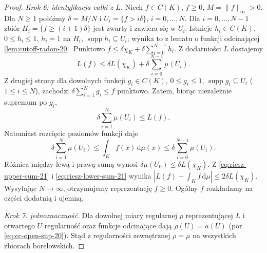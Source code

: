 \documentclass[11pt,a4paper,oneside]{book}
\numberwithin{equation}{chapter}
\theoremstyle{plain}
\theoremstyle{definition}
\theoremstyle{remark}
\begin{document}
\begin{proof}
\emph{Krok 6: identyfikacja całki z $L$.}
Niech $f\in C(K)$, $f\ge0$, $M=\|f\|_\infty>0$.
Dla $N\ge1$ połóżmy $\delta=M/N$ i
$U_i=\{f>i\delta\}$, $i=0,\ldots,N$.
Dla $i=0,\ldots,N-1$ zbiór
$H_i=\{f\ge(i+1)\delta\}$ jest zwarty i zawiera się
w $U_i$. Istnieje $h_i\in C(K)$, $0\le h_i\le1$,
$h_i=1$ na $H_i$, $\operatorname{supp}h_i\subseteq U_i$;
wynika to z lematu o funkcji odcinającej
\ref{lem:cutoff-radon-20}. Punktowo
$f\le\delta\chi_K+\delta\sum_{i=0}^{N-1}h_i$.
Z dodatniości $L$ dostajemy
\begin{equation}\label{eq:riesz-upper-sum-21}
 L(f)\le\delta L(\chi_K)+
           \delta\sum_{i=0}^{N-1}\mu(U_i).
\end{equation}
Z drugiej strony dla dowolnych funkcji
$g_i\in C(K)$, $0\le g_i\le1$,
$\operatorname{supp}g_i\subseteq U_i$ ($1\le i\le N$),
zachodzi $\delta\sum_{i=1}^{N}g_i\le f$ punktowo.
Zatem, biorąc niezależnie supremum po $g_i$,
\begin{equation}\label{eq:riesz-lower-sum-21}
 \delta\sum_{i=1}^{N}\mu(U_i)\le L(f).
\end{equation}
Natomiast rozcięcie poziomów funkcji daje
\[
 \delta\sum_{i=1}^{N}\mu(U_i)
 \le\int_Kf(x)\,\mathrm d\mu(x)
 \le\delta\sum_{i=0}^{N-1}\mu(U_i).
\]
Różnica między lewą i prawą sumą wynosi
$\delta\mu(U_0)\le\delta L(\chi_K)$.
Z \eqref{eq:riesz-upper-sum-21} i
\eqref{eq:riesz-lower-sum-21} wynika
$|L(f)-\int_K f\,\mathrm d\mu|\le2\delta L(\chi_K)$.
Wysyłając $N\to\infty$, otrzymujemy reprezentację
$f\ge0$. Ogólny $f$ rozkładamy na części dodatnią
i ujemną.

\emph{Krok 7: jednoznaczność.}
Dla dowolnej miary regularnej $\rho$ reprezentującej $L$
i otwartego $U$ regularność oraz funkcje odcinające
dają $\rho(U)=a(U)$ (por.
\eqref{eq:cc-open-sup-20}). Stąd z regularności
zewnętrznej $\rho=\mu$ na wszystkich zbiorach
borelowskich.
\end{proof}
\end{document}
